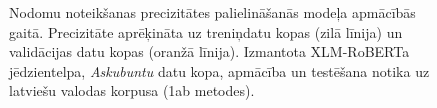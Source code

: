 \begin{figure}[h] 
   \centering
   \caption{Nodomu noteikšanas precizitātes palielināšanās modeļa apmācībās gaitā. Precizitāte aprēķināta uz treniņdatu kopas (zilā līnija) un validācijas datu kopas (oranžā līnija). Izmantota XLM-RoBERTa jēdzientelpa, \textit{Askubuntu} datu kopa, apmācība un testēšana notika uz latviešu valodas korpusa (1ab metodes).} 
   \label{fig:askubuntu-xlm}
\end{figure}


